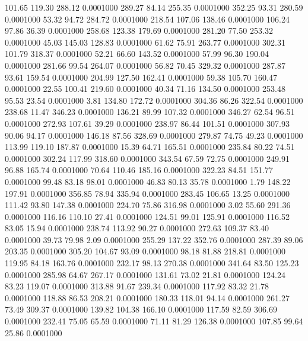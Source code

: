  101.65  119.30  288.12   0.0001000
 289.27   84.14  255.35   0.0001000
 352.25   93.31  280.59   0.0001000
  53.32   94.72  284.72   0.0001000
 218.54  107.06  138.46   0.0001000
 106.24   97.86   36.39   0.0001000
 258.68  123.38  179.69   0.0001000
 281.20   77.50  253.32   0.0001000
  45.03  145.03  128.83   0.0001000
  61.62   75.91  263.77   0.0001000
 302.31  101.79  318.37   0.0001000
  52.21   66.60  143.52   0.0001000
  57.99   96.30  190.04   0.0001000
 281.66   99.54  264.07   0.0001000
  56.82   70.45  329.32   0.0001000
 287.87   93.61  159.54   0.0001000
 204.99  127.50  162.41   0.0001000
  59.38  105.70  160.47   0.0001000
  22.55  100.41  219.60   0.0001000
  40.34   71.16  134.50   0.0001000
 253.48   95.53   23.54   0.0001000
   3.81  134.80  172.72   0.0001000
 304.36   86.26  322.54   0.0001000
 238.68   11.47  346.23   0.0001000
 136.21   89.99  107.32   0.0001000
 346.27   62.54   96.51   0.0001000
 272.93  107.61   39.29   0.0001000
 238.97   86.44  101.51   0.0001000
 307.93   90.06   94.17   0.0001000
 146.18   87.56  328.69   0.0001000
 279.87   74.75   49.23   0.0001000
 113.99  119.10  187.87   0.0001000
  15.39   64.71  165.51   0.0001000
 235.84   80.22   74.51   0.0001000
 302.24  117.99  318.60   0.0001000
 343.54   67.59   72.75   0.0001000
 249.91   96.88  165.74   0.0001000
  70.64  110.46  185.16   0.0001000
 322.23   84.51  151.77   0.0001000
  99.48   83.18   98.01   0.0001000
  46.83   80.13   35.78   0.0001000
   1.79  148.22  197.91   0.0001000
 356.85   78.94  335.94   0.0001000
 283.45  106.65   13.25   0.0001000
 111.42   93.80  147.38   0.0001000
 224.70   75.86  316.98   0.0001000
   3.02   55.60  291.36   0.0001000
 116.16  110.10   27.41   0.0001000
 124.51   99.01  125.91   0.0001000
 116.52   83.05   15.94   0.0001000
 238.74  113.92   90.27   0.0001000
 272.63  109.37   83.40   0.0001000
  39.73   79.98    2.09   0.0001000
 255.29  137.22  352.76   0.0001000
 287.39   89.06  203.35   0.0001000
 305.20  104.67   93.09   0.0001000
  98.18   81.88  218.81   0.0001000
 119.95   84.18  163.76   0.0001000
 232.17   98.13  270.38   0.0001000
 341.64   83.50  125.23   0.0001000
 285.98   64.67  267.17   0.0001000
 131.61   73.02   21.81   0.0001000
 124.24   83.23  119.07   0.0001000
 313.88   91.67  239.34   0.0001000
 117.92   83.32   21.78   0.0001000
 118.88   86.53  208.21   0.0001000
 180.33  118.01   94.14   0.0001000
 261.27   73.49  309.37   0.0001000
 139.82  104.38  166.10   0.0001000
 117.59   82.59  306.69   0.0001000
 232.41   75.05   65.59   0.0001000
  71.11   81.29  126.38   0.0001000
 107.85   99.64   25.86   0.0001000
